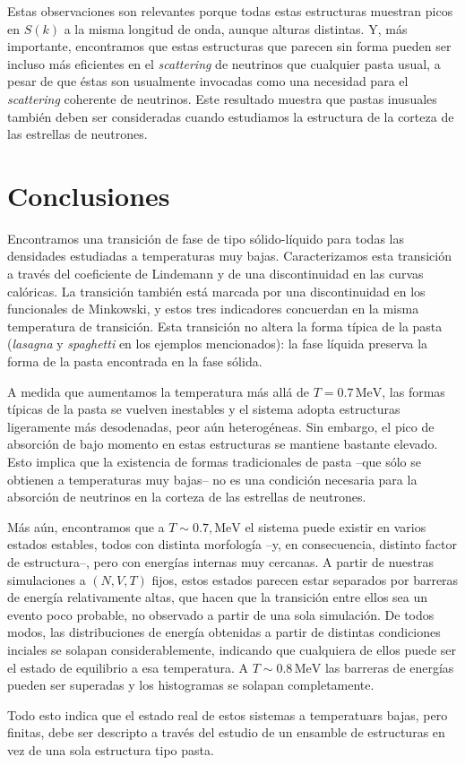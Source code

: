 Estas observaciones son relevantes porque todas estas estructuras muestran picos en $S(k)$ a la misma longitud de onda, aunque alturas distintas.
Y, más importante, encontramos que estas estructuras que parecen sin forma pueden ser incluso más eficientes en el \emph{scattering} de neutrinos que cualquier pasta usual, a pesar de que éstas son usualmente invocadas como una necesidad para el \emph{scattering} coherente de neutrinos.
Este resultado muestra que pastas inusuales también deben ser consideradas cuando estudiamos la estructura de la corteza de las estrellas de neutrones.

\section{Conclusiones}
\label{discussion}

Encontramos una transición de fase de tipo sólido-líquido para todas las densidades estudiadas a temperaturas muy bajas.
Caracterizamos esta transición a través del coeficiente de Lindemann y de una discontinuidad en las curvas calóricas.
La transición también está marcada por una discontinuidad en los funcionales de Minkowski, y estos tres indicadores concuerdan en la misma temperatura de transición.
Esta transición no altera la forma típica de la pasta (\emph{lasagna} y \emph{spaghetti}
en los ejemplos mencionados): la fase líquida preserva la forma de la pasta encontrada en la fase sólida.

A medida que aumentamos la temperatura más allá de $T=0.7\,\text{MeV}$, las formas típicas de la pasta se vuelven inestables y el sistema adopta estructuras ligeramente más desodenadas, peor aún heterogéneas.
Sin embargo, el pico de absorción de bajo momento en estas estructuras se mantiene bastante elevado.
Esto implica que la existencia de formas tradicionales de pasta --que sólo se obtienen a temperaturas muy bajas-- no es una condición necesaria para la absorción de neutrinos en la corteza de las estrellas de neutrones.

Más aún, encontramos que a $T\sim0.7,\text{MeV}$ el sistema puede existir en varios estados estables, todos con distinta morfología --y, en consecuencia, distinto factor de estructura--, pero con energías internas muy cercanas.
A partir de nuestras simulaciones a $(N,V,T)$ fijos, estos estados parecen estar separados por barreras de energía relativamente altas, que hacen que la transición entre ellos sea un evento poco probable, no observado a partir de una sola simulación.
De todos modos, las distribuciones de energía obtenidas a partir de distintas condiciones inciales se solapan considerablemente, indicando que cualquiera de ellos puede ser el estado de equilibrio a esa temperatura.
A $T\sim0.8\,\text{MeV}$ las barreras de energías pueden ser superadas y los histogramas se solapan completamente.

Todo esto indica que el estado real de estos sistemas a temperatuars bajas, pero finitas, debe ser descripto a través del estudio de un ensamble de estructuras en vez de una sola estructura tipo pasta.